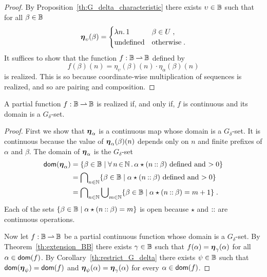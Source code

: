 \begin{proof}
  By Proposition~\ref{th:G_delta_characteristic} there exists
  $\upsilon \in \mathbb{B}$ such that for all $\beta \in \mathbb{B}$
  \begin{equation*}
    \text{\boldmath{$\eta$}}_{\upsilon}(\beta) =
    \begin{cases}
      \lambda n .\,1 & \beta \in U \;,\\
      \text{undefined} & \text{otherwise} \;.
    \end{cases}
  \end{equation*}
  It suffices to show that the function $f: \mathbb{B} \mathbin{\rightharpoonup} \mathbb{B}$ defined by
  \begin{equation*}
    f(\beta)(n) = \eta_{\upsilon}(\beta)(n) \cdot \eta_{\alpha}(\beta)(n)
  \end{equation*}
  is realized. This is so because coordinate-wise multiplication of
  sequences is realized, and so are pairing and composition.
\end{proof}


\begin{theorem}
  A partial function $f: \mathbb{B} \mathbin{\rightharpoonup} \mathbb{B}$ is realized if, and only
  if, $f$ is continuous and its domain is a $G_\delta$-set.
\end{theorem}

\begin{proof}
  First we show that $\text{\boldmath{$\eta$}}_\alpha$ is a continuous map whose domain
  is a $G_\delta$-set. It is continuous because the value of
  $\text{\boldmath{$\eta$}}_{\alpha}(\beta)(n)$ depends only on $n$ and finite prefixes of
  $\alpha$ and $\beta$. The domain of $\text{\boldmath{$\eta$}}_\alpha$ is the
  $G_\delta$-set
  \begin{align*}
    \mathsf{dom}(\text{\boldmath{$\eta$}}_\alpha)
    &= \{\beta \in \mathbb{B} \mid
      \forall\, n \,{\in}\, \mathbb{N}\,.\,
        \alpha \star (n \mathbin{{:}{:}} \beta) \ \text{defined and $> 0$}\} \\
    &= \bigcap\nolimits_{n \in \mathbb{N}}
      \{\beta \in \mathbb{B} \mid
        \alpha \star (n \mathbin{{:}{:}} \beta) \ \text{defined and $> 0$}\} \\
    &=  \bigcap\nolimits_{n \in \mathbb{N}}
        \bigcup\nolimits_{m \in \mathbb{N}}
          \{\beta \in \mathbb{B} \mid
          \alpha \star (n \mathbin{{:}{:}} \beta) = m + 1\} \;.
  \end{align*}
  Each of the sets $\{\beta \in \mathbb{B} \mid \alpha \star
    (n \mathbin{{:}{:}} \beta) = m\}$ is open because $\star$ and $\mathbin{{:}{:}}$
  are continuous operations.
  
  Now let $f: \mathbb{B} \mathbin{\rightharpoonup} \mathbb{B}$ be a partial continuous function whose
  domain is a $G_\delta$-set. By Theorem~\ref{th:extension_BB} there
  exists $\gamma \in \mathbb{B}$ such that $f(\alpha) = \text{\boldmath{$\eta$}}_{\gamma}(\alpha)$ for
  all $\alpha \in \mathsf{dom}(f)$. By Corollary~\ref{th:restrict_G_delta}
  there exists $\psi \in \mathbb{B}$ such that $\mathsf{dom}(\text{\boldmath{$\eta$}}_\psi) = \mathsf{dom}(f)$
  and $\text{\boldmath{$\eta$}}_{\psi}(\alpha) = \text{\boldmath{$\eta$}}_{\gamma}(\alpha)$ for every $\alpha \in
  \mathsf{dom}(f)$.
\end{proof}


